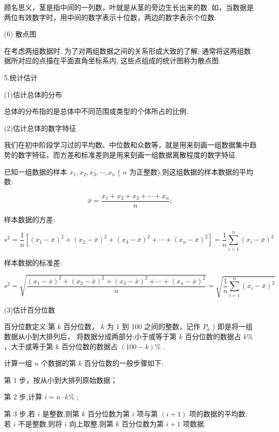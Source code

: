 顾名思义，茎是指中间的一列数，叶就是从茎的旁边生长出来的数. 如，当数据是两位有效数字时，用中间的数字表示十位数，两边的数字表示个位数.

(6) 散点图

在考虑两组数据时, 为了对两组数据之间的关系形成大致的了解, 通常将这两组数据所对应的点描在平面直角坐标系内, 这些点组成的统计图称为散点图.

5.统计估计

(1)估计总体的分布

总体的分布指的是总体中不同范围或类型的个体所占的比例.

(2)估计总体的数字特征

我们在初中阶段学习过的平均数、中位数和众数等，就是用来刻画一组数据集中趋势的数字特征，而方差和标准差则是用来刻画一组数据离散程度的数字特征.

已知一组数据的样本 ${x}_{1},{x}_{2},{x}_{3},\cdots ,{x}_{n}$ ( $n$ 为正整数),则这组数据的样本数据的平均数:

\[
\bar{x} = \dfrac{{x}_{1} + {x}_{2} + {x}_{3} + \cdots  + {x}_{n}}{n};
\]

样本数据的方差:

\[
{s}^{2} = \dfrac{1}{n}\left\lbrack  {{\left( {x}_{1} - \bar{x}\right) }^{2} + {\left( {x}_{2} - \bar{x}\right) }^{2} + {\left( {x}_{3} - \bar{x}\right) }^{2} + \cdots  + {\left( {x}_{n} - \bar{x}\right) }^{2}}\right\rbrack   = \dfrac{1}{n}\mathop{\sum }\limits_{{i = 1}}^{n}{\left( {x}_{i} - \bar{x}\right) }^{2}
\]

样本数据的标准差:

\[
{s}^{2} = \sqrt{\dfrac{{\left( {x}_{1} - \bar{x}\right) }^{2} + {\left( {x}_{2} - \bar{x}\right) }^{2} + {\left( {x}_{3} - \bar{x}\right) }^{2} + \cdots  + {\left( {x}_{n} - \bar{x}\right) }^{2}}{n}} = \sqrt{\dfrac{1}{n}\mathop{\sum }\limits_{{i = 1}}^{n}{\left( {x}_{i} - \bar{x}\right) }^{2}}
\]

(3)估计百分位数

   百分位数定义:第 $k$ 百分位数， $k$ 为 1 到 100 之间的整数，记作 ${P}_{k}$ ) 即是将一组数据从小到大排列后， 将数据分成两部分:小于或等于第 $k$ 百分位数的数据占 $k\%$ ，大于或等于第 $k$ 百分位数的数据占 $\left( {{100} - k}\right) \%$ .

  计算一组 $n$ 个数据的第 $k$ 百分位数的一般步骤如下:

第 1 步，按从小到大排列原始数据；

第 2 步,计算 $i = n \cdot  k\%$ ;

第 3 步,若 $i$ 是整数,则第 $k$ 百分位数为第 $i$ 项与第 $\left( {i + 1}\right)$ 项的数据的平均数; 若 $i$ 不是整数,则将 $i$ 向上取整,则第 $k$ 百分位数为第 $i + 1$ 项数据.

